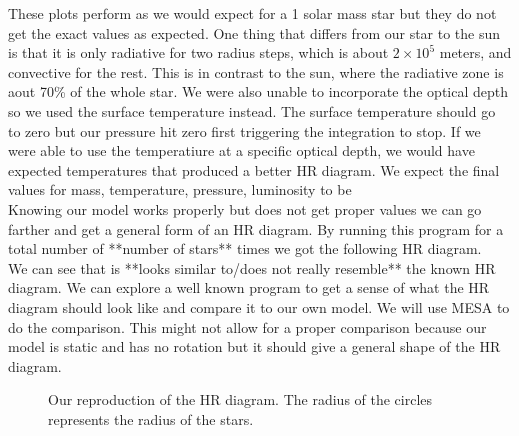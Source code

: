\documentclass[10pt]{article}
\begin{document}
These plots perform as we would expect for a 1 solar mass star but they do not get the exact values as expected. One thing that differs from our star to the sun is that it is only radiative for two radius steps, which is about $2\times 10^5$ meters, and convective for the rest. This is in contrast to the sun, where the radiative zone is aout 70\% of the whole star. We were also unable to incorporate the optical depth so we used the surface temperature instead. The surface temperature should go to zero but our pressure hit zero first triggering the integration to stop. If we were able to use the temperatiure at a specific optical depth, we would have expected temperatures that produced a better HR diagram. We expect the final values for mass, temperature, pressure, luminosity to be \\

Knowing our model works properly but does not get proper values we can go farther and get a general form of an HR diagram. By running this program for a total number of **number of stars** times we got the following HR diagram. \\

We can see that is **looks similar to/does not really resemble** the known HR diagram. We can explore a well known program to get a sense of what the HR diagram should look like and compare it to our own model.  We will use MESA to do the comparison. This might not allow for a proper comparison because our model is static and has no rotation but it should give a general shape of the HR diagram. \\

\begin{figure}[p]
 \begin{centering}
  
  \caption{Our reproduction of the HR diagram. The radius of the circles represents the radius of the stars.}
 \end{centering}
\end{figure}
\end{document}

